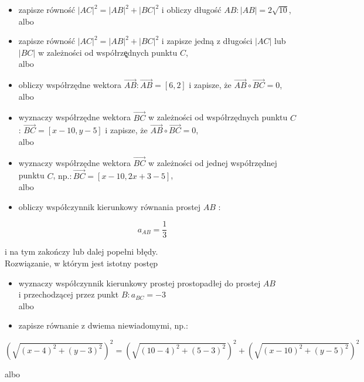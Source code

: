 \documentclass[10pt]{article}
\begin{document}
\begin{itemize}
  \item zapisze równość $|A C|^{2}=|A B|^{2}+|B C|^{2}$ i obliczy długość $A B:|A B|=2 \sqrt{10}$,\\
albo
  \item zapisze równość $|A C|^{2}=|A B|^{2}+|B C|^{2}$ i zapisze jedną z długości $|A C|$ lub $|B C|$ w zależności od współrzę̨dnych punktu $C$,\\
albo
  \item obliczy współrzędne wektora $\overrightarrow{A B}: \overrightarrow{A B}=[6,2]$ i zapisze, że $\overrightarrow{A B} \circ \overrightarrow{B C}=0$,\\
albo
  \item wyznaczy współrzędne wektora $\overrightarrow{B C}$ w zależności od współrzędnych punktu $C$ : $\overrightarrow{B C}=[x-10, y-5]$ i zapisze, że $\overrightarrow{A B} \circ \overrightarrow{B C}=0$,\\
albo
  \item wyznaczy współrzędne wektora $\overrightarrow{B C}$ w zależności od jednej współrzędnej punktu $C$, $\mathrm{np} .: \overrightarrow{B C}=[x-10,2 x+3-5]$,\\
albo
  \item obliczy współczynnik kierunkowy równania prostej $A B$ :
\end{itemize}

$$
a_{A B}=\frac{1}{3}
$$

i na tym zakończy lub dalej popełni błędy.\\
Rozwiązanie, w którym jest istotny postęp

\begin{itemize}
  \item wyznaczy współczynnik kierunkowy prostej prostopadłej do prostej $A B$\\
i przechodzącej przez punkt $B: a_{B C}=-3$\\
albo
  \item zapisze równanie z dwiema niewiadomymi, np.:
\end{itemize}

$$
\left(\sqrt{(x-4)^{2}+(y-3)^{2}}\right)^{2}=\left(\sqrt{(10-4)^{2}+(5-3)^{2}}\right)^{2}+\left(\sqrt{(x-10)^{2}+(y-5)^{2}}\right)^{2}
$$

albo
\end{document}
